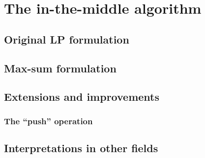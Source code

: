 \section{The in-the-middle algorithm}
\subsection{Original LP formulation}
\subsection{Max-sum formulation}
\subsection{Extensions and improvements}
\subsubsection{The \enquote{push} operation}
\subsection{Interpretations in other fields}
